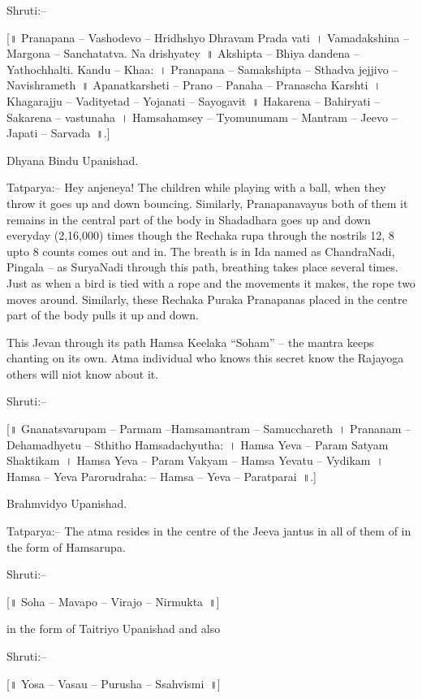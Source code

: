 Shruti:–

[॥ Pranapana – Vashodevo – Hridhshyo Dhravam Prada vati~। Vamadakshina – Margona – Sanchatatva. Na drishyatey~॥ Akshipta – Bhiya dandena – Yathochhalti. Kandu – Khaa:~। Pranapana – Samakshipta – Sthadva jejjivo – Navishrameth~॥ Apanatkarsheti – Prano – Panaha – Pranascha Karshti~। Khagarajju – Vadityetad – Yojanati – Sayogavit~॥ Hakarena – Bahiryati – Sakarena – vastunaha~। Hamsahamsey – Tyomunumam – Mantram – Jeevo – Japati – Sarvada~॥.]

Dhyana Bindu Upanishad.

Tatparya:– Hey anjeneya! The children while playing with a ball, when they throw it goes up and down bouncing. Similarly, Pranapanavayus both of them it remains in the central part of the body in Shadadhara goes up and down everyday (2,16,000) times though the Rechaka rupa through the nostrils 12, 8 upto 8 counts comes out and in. The breath is in Ida named as ChandraNadi, Pingala – as SuryaNadi through this path, breathing takes place several times. Just as when a bird is tied with a rope and the movements it makes, the rope two moves around. Similarly, these Rechaka Puraka Pranapanas placed in the centre part of the body pulls it up and down.

This Jevan through its path Hamsa Keelaka “Soham” – the mantra keeps chanting on its own. Atma individual who knows this secret know the Rajayoga others will niot know about it.

Shruti:–

[॥ Gnanatsvarupam – Parmam –Hamsamantram – Samucchareth~। Prananam – Dehamadhyetu – Sthitho Hamsadachyutha:~। Hamsa Yeva – Param Satyam Shaktikam~। Hamsa Yeva – Param Vakyam – Hamsa Yevatu – Vydikam~। Hamsa – Yeva Parorudraha: – Hamsa – Yeva – Paratparai~॥.]

Brahmvidyo Upanishad.

Tatparya:– The atma resides in the centre of the Jeeva jantus in all of them of in the form of Hamsarupa.

Shruti:–

[॥ Soha – Mavapo – Virajo – Nirmukta~॥]

in the form of Taitriyo Upanishad and also

Shruti:–

[॥ Yosa – Vasau – Purusha – Ssahvismi~॥]

